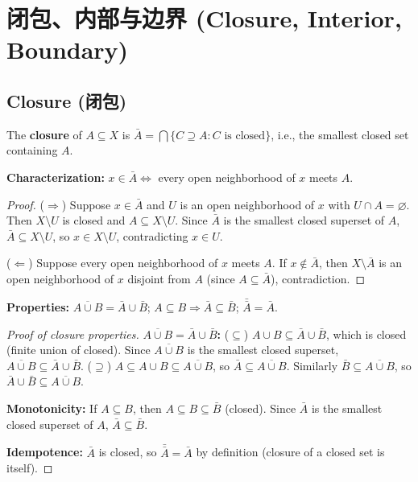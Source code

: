 \documentclass{article}
\begin{document}
\section{闭包、内部与边界 (Closure, Interior, Boundary)}

\subsection{Closure (闭包)}\label{def:closure}
\begin{definition}
  The \textbf{closure} of $A \subseteq X$ is $\bar{A} = \bigcap\{C
  \supseteq A : C \text{ is closed}\}$, i.e., the smallest closed set
  containing $A$.
\end{definition}
\textbf{Characterization:} $x \in \bar{A} \iff$ every open
neighborhood of $x$ meets $A$.

\begin{proof}
  ($\Rightarrow$) Suppose $x \in \bar{A}$ and $U$ is an open
  neighborhood of $x$ with $U \cap A = \varnothing$.
  Then $X \setminus U$ is closed and $A \subseteq X \setminus U$.
  Since $\bar{A}$ is the smallest closed superset of $A$, $\bar{A}
  \subseteq X \setminus U$,
  so $x \in X \setminus U$, contradicting $x \in U$.

  ($\Leftarrow$) Suppose every open neighborhood of $x$ meets $A$.
  If $x \notin \bar{A}$, then $X \setminus \bar{A}$ is an open
  neighborhood of $x$
  disjoint from $A$ (since $A \subseteq \bar{A}$), contradiction.
\end{proof}
\textbf{Properties:} $\overline{A \cup B} = \bar{A} \cup \bar{B}$; $A
\subseteq B \Rightarrow \bar{A} \subseteq \bar{B}$; $\bar{\bar{A}} = \bar{A}$.

\begin{proof}[Proof of closure properties]
  \textbf{$\overline{A \cup B} = \bar{A} \cup \bar{B}$:}
  ($\subseteq$) $A \cup B \subseteq \bar{A} \cup \bar{B}$, which is
  closed (finite union of closed).
  Since $\overline{A \cup B}$ is the smallest closed superset,
  $\overline{A \cup B} \subseteq \bar{A} \cup \bar{B}$.
  ($\supseteq$) $A \subseteq A \cup B \subseteq \overline{A \cup B}$,
  so $\bar{A} \subseteq \overline{A \cup B}$.
  Similarly $\bar{B} \subseteq \overline{A \cup B}$, so $\bar{A} \cup
  \bar{B} \subseteq \overline{A \cup B}$.

  \textbf{Monotonicity:} If $A \subseteq B$, then $A \subseteq B
  \subseteq \bar{B}$ (closed).
  Since $\bar{A}$ is the smallest closed superset of $A$, $\bar{A}
  \subseteq \bar{B}$.

  \textbf{Idempotence:} $\bar{A}$ is closed, so $\bar{\bar{A}} =
  \bar{A}$ by definition (closure of a closed set is itself).
\end{proof}
\end{document}
